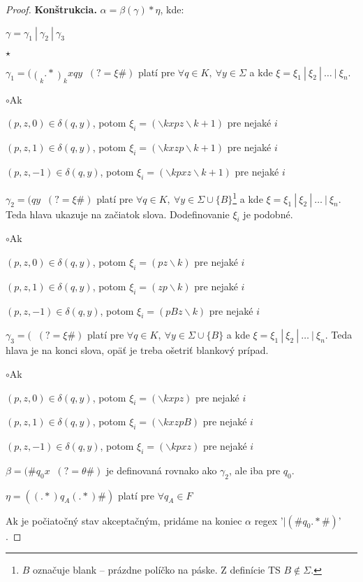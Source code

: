 \begin{proof}
\textbf{Konštrukcia.} $\alpha = \beta(\gamma)*\eta$, kde:
\begin{itemize}
\item $\gamma = \gamma_1~|~\gamma_2~|~\gamma_3$
\begin{list}{$\star$}{}
\item $ \displaystyle \gamma_1 = (\mathop(_k.*\mathop)_k x q y \mathop(_{k+1} .* \mathop)_{k+1} \#)(?= \xi \#)$ platí pre $\forall q \in K,~\forall y \in \Sigma$ a kde $ \xi = \xi_1 ~|~ \xi_2 ~|~ \dots ~|~ \xi_n $.
\begin{list}{$\circ$}{Ak}
\item $ (p,z,0) \in \delta(q,y)$, potom $\xi_i = (\backslash kx p z \backslash k+1)$ pre nejaké $i$
\item $ (p,z,1) \in \delta(q,y)$, potom $\xi_i = (\backslash kx z p \backslash k+1)$ pre nejaké $i$
\item $ (p,z,-1) \in \delta(q,y)$, potom $\xi_i = (\backslash kp x z \backslash k+1)$ pre nejaké $i$
\end{list}
\item $ \displaystyle \gamma_2 = (q y \mathop(_{k} .* \mathop)_{k} \#)(?= \xi \#)$ platí pre $\forall q \in K,~\forall y \in \Sigma \cup \lbrace B \rbrace$\footnote{$B$ označuje blank -- prázdne políčko na páske. Z definície TS $B \notin \Sigma$.} a kde $ \xi = \xi_1 ~|~ \xi_2 ~|~ \dots ~|~ \xi_n $. Teda hlava ukazuje na začiatok slova. Dodefinovanie $\xi_i$ je podobné.
\begin{list}{$\circ$}{Ak}
\item $ (p,z,0) \in \delta(q,y)$, potom $\xi_i = (p z \backslash k)$ pre nejaké $i$
\item $ (p,z,1) \in \delta(q,y)$, potom $\xi_i = (z p \backslash k)$ pre nejaké $i$
\item $ (p,z,-1) \in \delta(q,y)$, potom $\xi_i = (p B z \backslash k)$ pre nejaké $i$ 
\end{list}
\item $ \displaystyle \gamma_3 = (\mathop(_k.*\mathop)_k x q y \#)(?= \xi \#)$ platí pre $\forall q \in K,~\forall y \in \Sigma \cup \lbrace B \rbrace$ a kde $ \xi = \xi_1 ~|~ \xi_2 ~|~ \dots ~|~ \xi_n $. Teda hlava je na konci slova, opäť je treba ošetriť blankový prípad.
\begin{list}{$\circ$}{Ak}
\item $ (p,z,0) \in \delta(q,y)$, potom $\xi_i = (\backslash kx p z)$ pre nejaké $i$
\item $ (p,z,1) \in \delta(q,y)$, potom $\xi_i = (\backslash kx z p B)$ pre nejaké $i$
\item $ (p,z,-1) \in \delta(q,y)$, potom $\xi_i = (\backslash kp x z)$ pre nejaké $i$
\end{list}
\end{list}
\item $\displaystyle \beta = (\#q_0x\mathop(_k.*\mathop)_k\#)(?=\theta\#) $ je definovaná rovnako ako $\gamma_2$, ale iba pre $q_0$.
\item $\eta = ((.*) q_A (.*)\#)$ platí pre $\forall q_A \in F$
\end{itemize}
Ak je počiatočný stav akceptačným, pridáme na koniec $\alpha$ regex '$| (\#q_0.*\#)$' .
\end{proof}

